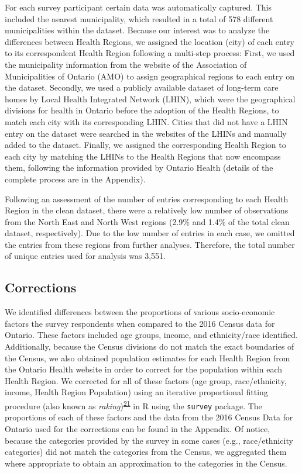 \documentclass[
  letterpaper,
  DIV=11,
  numbers=noendperiod]{scrartcl}
\begin{document}
For each survey participant certain data was automatically captured.
This included the nearest municipality, which resulted in a total of 578
different municipalities within the dataset. Because our interest was to
analyze the differences between Health Regions, we assigned the location
(city) of each entry to its correspondent Health Region following a
multi-step process: First, we used the municipality information from the
website of the Association of Municipalities of Ontario (AMO) to assign
geographical regions to each entry on the dataset. Secondly, we used a
publicly available dataset of long-term care homes by Local Health
Integrated Network (LHIN), which were the geographical divisions for
health in Ontario before the adoption of the Health Regions, to match
each city with its corresponding LHIN. Cities that did not have a LHIN
entry on the dataset were searched in the websites of the LHINs and
manually added to the dataset. Finally, we assigned the corresponding
Health Region to each city by matching the LHINs to the Health Regions
that now encompass them, following the information provided by Ontario
Health (details of the complete process are in the Appendix).

Following an assessment of the number of entries corresponding to each
Health Region in the clean dataset, there were a relatively low number
of observations from the North East and North West regions (2.9\% and
1.4\% of the total clean dataset, respectively). Due to the low number
of entries in each case, we omitted the entries from these regions from
further analyses. Therefore, the total number of unique entries used for
analysis was 3,551.

\hypertarget{corrections}{%
\subsection{Corrections}\label{corrections}}

We identified differences between the proportions of various
socio-economic factors the survey respondents when compared to the 2016
Census data for Ontario. These factors included age groups, income, and
ethnicity/race identified. Additionally, because the Census divisions do
not match the exact boundaries of the Census, we also obtained
population estimates for each Health Region from the Ontario Health
website in order to correct for the population within each Health
Region. We corrected for all of these factors (age group,
race/ethnicity, income, Health Region Population) using an iterative
proportional fitting procedure (also known as
\emph{raking})\textsuperscript{\protect\hyperlink{ref-deming1940}{21}}
in R using the \texttt{survey} package. The proportions of each of these
factors and the data from the 2016 Census Data for Ontario used for the
corrections can be found in the Appendix. Of notice, because the
categories provided by the survey in some cases (e.g., race/ethnicity
categories) did not match the categories from the Census, we aggregated
them where appropriate to obtain an approximation to the categories in
the Census.
\end{document}
